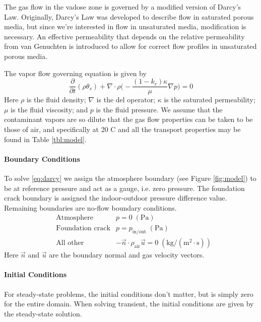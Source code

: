 The gas flow in the vadose zone is governed by a modified version of Darcy's Law.
Originally, Darcy's Law was developed to describe flow in saturated porous media, but since we're interested in flow in unsaturated media, modification is necessary.
An effective permeability that depends on the relative permeability from van Genuchten is introduced to allow for correct flow profiles in unsaturated porous media.\par

The vapor flow governing equation is given by
\begin{equation}\label{eq:darcy}
  \frac{\partial}{\partial t} (\rho \theta_s) + \nabla \cdot \rho \Big( -\frac{(1-k_r) \kappa}{\mu} \nabla p \Big) = 0
\end{equation}
Here $\rho$ is the fluid density;
$\nabla$ is the del operator;
$\kappa$ is the saturated permeability;
$\mu$ is the fluid viscosity; and $p$ is the fluid pressure.
We assume that the contaminant vapors are so dilute that the gas flow properties can be taken to be those of air, and specifically at 20 \degree C and all the transport properties may be found in Table \ref{tbl:model}.\par

\paragraph{Boundary Conditions}\label{par:darcy_bc}

To solve \eqref{eq:darcy} we assign the atmosphere boundary (see Figure \ref{fig:model}) to be at reference pressure and act as a gauge, i.e. zero pressure.
The foundation crack boundary is assigned the indoor-outdoor pressure difference value.
Remaining boundaries are no-flow boundary conditions.
\begin{align}
  &\text{Atmosphere} & p = 0 \; \mathrm{(Pa)} \\
  &\text{Foundation crack} & p = p_\mathrm{in/out} \; \mathrm{(Pa)} \\
  &\text{All other} & -\vec{n}\cdot\rho_\mathrm{air}\vec{u} = 0 \; \mathrm{(kg/(m^2\cdot s))}
\end{align}
Here $\vec{n}$ and $\vec{u}$ are the boundary normal and gas velocity vectors.

\paragraph{Initial Conditions}\label{darcy_ic}

For steady-state problems, the initial conditions don't matter, but is simply zero for the entire domain.
When solving transient, the initial conditions are given by the steady-state solution.\par

